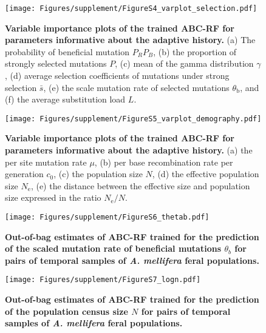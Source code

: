 \documentclass[a4paper, 12pt]{article}
\begin{document}
\begin{figure}[ht]
  \centering
  \texttt{[image: Figures/supplement/FigureS4\_varplot\_selection.pdf]}
  \small\caption{\textbf{Variable importance plots of the trained ABC-RF for parameters informative about the adaptive history.} (a) The probability of beneficial mutation $P_RP_B$, (b) the proportion of strongly selected mutations $P$, (c) mean of the gamma distribution $\gamma$, (d) average selection coefficients of mutations under strong selection $\bar{s}$, (e) the scale mutation rate of selected mutations $\theta_{\mathrm{b}}$, and (f) the average substitution load $L$.}
  \label{fig:supple_pods_varplots_sel}
\end{figure}

\begin{figure}[ht]
  \centering
  \texttt{[image: Figures/supplement/FigureS5\_varplot\_demography.pdf]}
  \small\caption{\textbf{Variable importance plots of the trained ABC-RF for parameters informative about the adaptive history.} (a) the per site mutation rate $\mu$, (b) per base recombination rate per generation $c_{\mathrm{0}}$, (c) the population size $N$, (d) the effective population size $N_{\mathrm{e}}$, (e) the distance between the effective size and population size expressed in the ratio $N_{\mathrm{e}}/N$.}
  \label{fig:supple_pods_varplots_demo}
\end{figure}

\begin{figure}[ht]
  \centering
  \texttt{[image: Figures/supplement/FigureS6\_thetab.pdf]}
  \small\caption{\textbf{Out-of-bag estimates of ABC-RF trained for the prediction of the scaled mutation rate of beneficial mutations $\theta_{b}$ for pairs of temporal samples of \textit{A. mellifera} feral populations.}}
  \label{fig:supple_feralbee_thetab}
\end{figure}

\begin{figure}[ht]
  \centering
  \texttt{[image: Figures/supplement/FigureS7\_logn.pdf]}
  \small\caption{\textbf{Out-of-bag estimates of ABC-RF trained for the prediction of the population census size $N$ for pairs of temporal samples of \textit{A. mellifera} feral populations.}}
  \label{fig:supple_feralbee_N}
\end{figure}
\end{document}

